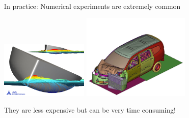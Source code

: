 \documentclass{beamer}
\begin{document}
\begin{frame}{}
\begin{exampleblock}{In practice: Numerical experiments are extremely common}
\begin{center}
\includegraphics[height=2.8cm]{figures/waterflow} \qquad \includegraphics[height=4.2cm]{figures/image15}
\end{center}
They are less expensive but can be very time consuming!
\end{exampleblock}
\end{frame}
\end{document}
